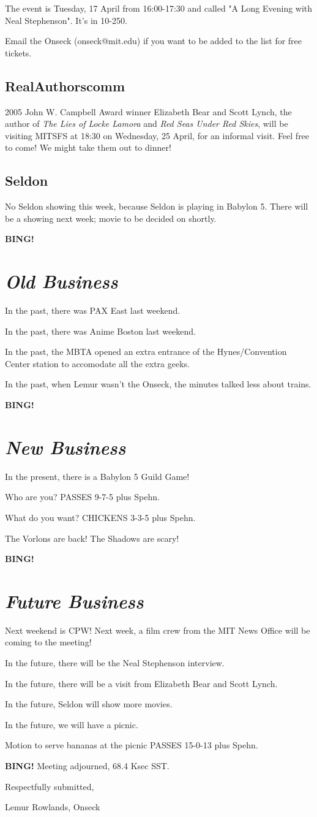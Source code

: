 \documentclass[10pt]{article}
\newcommand{\bing}{{\bf BING!} }
\newcommand{\goto}[1]{\bing \vskip 12pt \section*{{\em{#1}}}}
\newcommand{\ps}{ plus Spehn\xspace}
\newcommand{\onseck}{Lemur Rowlands, Onseck}
\begin{document}
The event is Tuesday, 17 April from 16:00-17:30 and called "A 
Long Evening with Neal Stephenson". It's in 10-250.

Email the Onseck (onseck@mit.edu) if you want to be added to 
the list for free tickets. 


\subsection*{RealAuthorscomm}

2005 John W. Campbell Award winner Elizabeth Bear and Scott Lynch,
the author of \emph{The Lies of Locke Lamora} and \emph{Red Seas 
Under Red Skies}, will be visiting MITSFS at 18:30 on Wednesday, 
25 April, for an informal visit.  Feel free to come!  We might
take them out to dinner!


\subsection*{Seldon}

No Seldon showing this week, because Seldon is playing in Babylon 5.
There will be a showing next week; movie to be decided on shortly.


\goto{Old Business}

In the past, there was PAX East last weekend.

In the past, there was Anime Boston last weekend.

In the past, the MBTA opened an extra entrance of the Hynes/Convention 
Center station to accomodate all the extra geeks. 

In the past, when Lemur wasn't the Onseck, the minutes talked less
about trains.


\goto{New Business}

In the present, there is a Babylon 5 Guild Game!

Who are you? PASSES 9-7-5\ps.

What do you want? CHICKENS 3-3-5\ps.  

The Vorlons are back!  The Shadows are scary!


\goto{Future Business}

Next weekend is CPW!  Next week, a film crew from the MIT News Office
will be coming to the meeting!

In the future, there will be the Neal Stephenson interview.

In the future, there will be a visit from Elizabeth Bear and Scott Lynch.

In the future, Seldon will show more movies.

In the future, we will have a picnic.

Motion to serve bananas at the picnic PASSES 15-0-13\ps.

\bing
\noindent
Meeting adjourned, 68.4 Ksec SST.

\vspace{18pt}

\centerline{Respectfully submitted,}
\centerline{\onseck}
\end{document}
